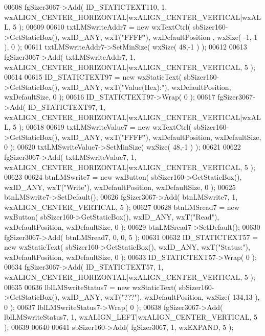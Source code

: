 \begin{DoxyCode}
00608     fgSizer3067->Add( ID_STATICTEXT110, 1, wxALIGN\_CENTER\_HORIZONTAL|wxALIGN\_CENTER\_VERTICAL|wxALL, 5 );
00609     
00610     txtLMSwriteAddr7 = \textcolor{keyword}{new} wxTextCtrl( sbSizer160->GetStaticBox(), wxID\_ANY, wxT(\textcolor{stringliteral}{"FFFF"}), wxDefaultPosition
      , wxSize( -1,-1 ), 0 );
00611     txtLMSwriteAddr7->SetMinSize( wxSize( 48,-1 ) );
00612     
00613     fgSizer3067->Add( txtLMSwriteAddr7, 1, wxALIGN\_CENTER\_HORIZONTAL|wxALIGN\_CENTER\_VERTICAL, 5 );
00614     
00615     ID_STATICTEXT97 = \textcolor{keyword}{new} wxStaticText( sbSizer160->GetStaticBox(), wxID\_ANY, wxT(\textcolor{stringliteral}{"Value(Hex):"}), 
      wxDefaultPosition, wxDefaultSize, 0 );
00616     ID_STATICTEXT97->Wrap( 0 );
00617     fgSizer3067->Add( ID_STATICTEXT97, 1, wxALIGN\_CENTER\_HORIZONTAL|wxALIGN\_CENTER\_VERTICAL|wxALL, 5 );
00618     
00619     txtLMSwriteValue7 = \textcolor{keyword}{new} wxTextCtrl( sbSizer160->GetStaticBox(), wxID\_ANY, wxT(\textcolor{stringliteral}{"FFFF"}), 
      wxDefaultPosition, wxDefaultSize, 0 );
00620     txtLMSwriteValue7->SetMinSize( wxSize( 48,-1 ) );
00621     
00622     fgSizer3067->Add( txtLMSwriteValue7, 1, wxALIGN\_CENTER\_HORIZONTAL|wxALIGN\_CENTER\_VERTICAL, 5 );
00623     
00624     btnLMSwrite7 = \textcolor{keyword}{new} wxButton( sbSizer160->GetStaticBox(), wxID\_ANY, wxT(\textcolor{stringliteral}{"Write"}), wxDefaultPosition, 
      wxDefaultSize, 0 );
00625     btnLMSwrite7->SetDefault(); 
00626     fgSizer3067->Add( btnLMSwrite7, 1, wxALIGN\_CENTER\_VERTICAL, 5 );
00627     
00628     btnLMSread7 = \textcolor{keyword}{new} wxButton( sbSizer160->GetStaticBox(), wxID\_ANY, wxT(\textcolor{stringliteral}{"Read"}), wxDefaultPosition, 
      wxDefaultSize, 0 );
00629     btnLMSread7->SetDefault(); 
00630     fgSizer3067->Add( btnLMSread7, 0, 0, 5 );
00631     
00632     ID_STATICTEXT57 = \textcolor{keyword}{new} wxStaticText( sbSizer160->GetStaticBox(), wxID\_ANY, wxT(\textcolor{stringliteral}{"Status:"}), 
      wxDefaultPosition, wxDefaultSize, 0 );
00633     ID_STATICTEXT57->Wrap( 0 );
00634     fgSizer3067->Add( ID_STATICTEXT57, 1, wxALIGN\_CENTER\_HORIZONTAL|wxALIGN\_CENTER\_VERTICAL, 5 );
00635     
00636     lblLMSwriteStatus7 = \textcolor{keyword}{new} wxStaticText( sbSizer160->GetStaticBox(), wxID\_ANY, wxT(\textcolor{stringliteral}{"???"}), 
      wxDefaultPosition, wxSize( 134,13 ), 0 );
00637     lblLMSwriteStatus7->Wrap( 0 );
00638     fgSizer3067->Add( lblLMSwriteStatus7, 1, wxALIGN\_LEFT|wxALIGN\_CENTER\_VERTICAL, 5 );
00639     
00640     
00641     sbSizer160->Add( fgSizer3067, 1, wxEXPAND, 5 );

\end{DoxyCode}
